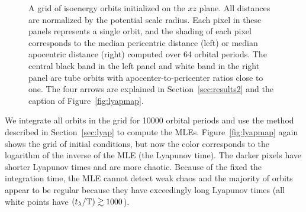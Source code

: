 \begin{figure}[h]%
\centering
\caption{ A grid of isoenergy orbits initialized on the $xz$ plane. All distances are normalized by the potential scale radius. Each pixel in these panels represents a single orbit, and the shading of each pixel corresponds to the median pericentric distance (left) or median apocentric distance (right) computed over 64 orbital periods. The central black band in the left panel and white band in the right panel are tube orbits with apocenter-to-pericenter ratios close to one. The four arrows are explained in Section~\ref{sec:results2} and the caption of Figure~\ref{fig:lyapmap}.}
\label{fig:apoper}
\end{figure}

We integrate all orbits in the grid for 10000 orbital periods and use the method described in Section~\ref{sec:lyap} to compute the MLEs. Figure~\ref{fig:lyapmap} again shows the grid of initial conditions, but now the color corresponds to the logarithm of the inverse of the MLE (the Lyapunov time). The darker pixels have shorter Lyapunov times and are more chaotic. Because of the fixed the integration time, the MLE cannot detect weak chaos and the majority of orbits appear to be regular because they have exceedingly long Lyapunov times (all white points have $(t_\lambda/{\rm T}) \gtrsim 1000$). 


